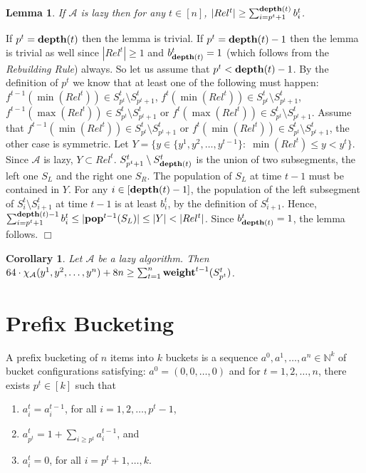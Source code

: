 \documentclass[11pt]{article}
\newtheorem{corollary}[theorem]{Corollary}
\newtheorem{lemma}[theorem]{Lemma}
\newcommand{\qed}{$\Box$}
\newenvironment{proof}{\noindent {\bf Proof:}}{\hfill \qed \smallskip}
\newcommand{\A}{\mathcal{A}}
\newcommand{\N}{\mathbb{N}}
\newcommand{\pop}{{\rm {\bf pop}}}
\newcommand{\weight}{{\rm {\bf weight}}}
\newcommand{\depth}{{\rm {\bf depth}}}
\begin{document}
\begin{lemma}
If $\A$ is lazy then for any $t\in[n]$, $|Rel^t| \ge \sum_{i=p^t+1}^{\depth(t)} b^t_i$.
\end{lemma}

\begin{proof}
If $p^t = \depth(t)$ then the lemma is trivial. If $p^t = \depth(t)-1$ then the lemma is trivial as well
since $|Rel^t|\ge 1$ and $b^t_{\depth(t)}=1$ (which follows from the \emph{Rebuilding Rule}) always. So let us assume that $p^t < \depth(t)-1$.
By the definition of $p^t$ we know that at least one of the following must happen: $f^{t-1}(\min(Rel^t)) \in S^t_{p^t} \setminus S^t_{p^t+1}$, $f^{t}(\min(Rel^t)) \in S^t_{p^t} \setminus S^t_{p^t+1}$, $f^{t-1}(\max(Rel^t)) \in S^t_{p^t} \setminus S^t_{p^t+1}$ or $f^{t}(\max(Rel^t)) \in S^t_{p^t} \setminus S^t_{p^t+1}$. Assume that $f^{t-1}(\min(Rel^t)) \in S^t_{p^t} \setminus S^t_{p^t+1}$ or $f^{t}(\min(Rel^t)) \in S^t_{p^t} \setminus S^t_{p^t+1}$,
the other case is symmetric. Let $Y = \{ y \in \{y^1,y^2,\dotsc,y^{t-1}\}:\; \min(Rel^t) \le y < y^t\}$.
Since $\A$ is lazy,  $Y \subset Rel^t$. $S^t_{p^t+1} \setminus S^t_{\depth(t)}$ is the union of two subsegments, the left one $S_L$ and the right one $S_R$.
The population of $S_L$ at time $t-1$ must be contained in $Y$.
For any $i\in [\depth(t)-1]$, the population of the left subsegment of $S^t_i \setminus S^t_{i+1}$ at time $t-1$ is at least $b^t_i$, by the definition of $S^t_{i+1}$.
Hence, $\sum_{i=p^t+1}^{\depth(t)-1} b^t_i \le |\pop^{t-1}(S_L)| \le |Y| < |Rel^t|$. Since $b^t_{\depth(t)}=1$, the lemma follows.
\end{proof}

\begin{corollary}\label{c-main}
Let $\A$ be a lazy algorithm. Then $64 \cdot \chi_\A(y^1,y^2,\dotsc,y^n) + 8n \ge \sum_{t=1}^n \weight^{t-1}(S^t_{p^t})$.
\end{corollary}


\section{Prefix Bucketing}

A prefix bucketing of $n$ items into $k$ buckets is a sequence $a^0,a^1,\dotsc,a^n\in \N^k$ of bucket configurations
satisfying: $a^0 = (0,0,\dotsc,0)$ and for $t=1,2,\dotsc,n$, there exists $p^{t} \in [k]$ such that
\begin{enumerate}
\item $a^t_i = a^{t-1}_i$, for all $i=1,2,\dotsc,p^{t}-1$,
\item $a^t_{p^{t}} = 1+ \sum_{i\ge p^{t}} a^{t-1}_i$, and
\item $a^t_i = 0$, for all $i=p^{t}+1,\dotsc,k$.
\end{enumerate}
\end{document}
